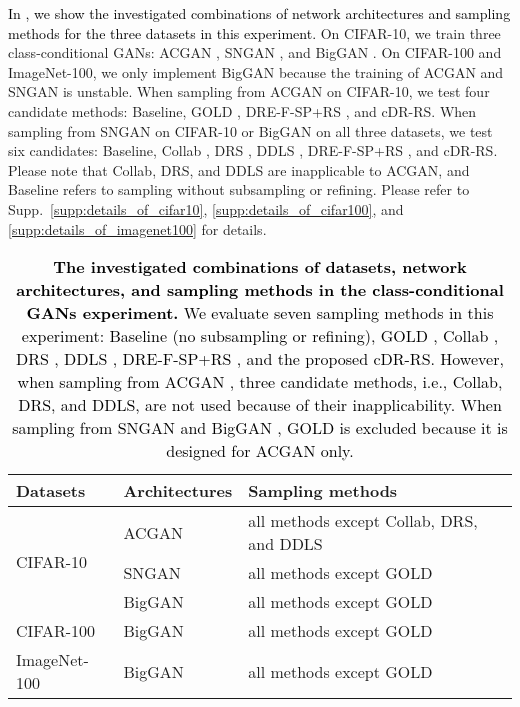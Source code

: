 \documentclass[final,12pt, 3p,times]{elsarticle}
\def\rev#1{\textcolor{black}{#1}}
\begin{document}
\rev{In , we show the investigated combinations of network architectures and sampling methods for the three datasets in this experiment.} 
On CIFAR-10, we train three class-conditional GANs: ACGAN \cite{odena2017conditional}, SNGAN \cite{miyato2018spectral}, and BigGAN \cite{brock2018large}. On CIFAR-100 and ImageNet-100, we only implement BigGAN because the training of ACGAN and SNGAN is unstable. When sampling from ACGAN on CIFAR-10, we test four candidate methods: Baseline, GOLD \cite{mo2019mining}, DRE-F-SP+RS \cite{ding2020subsampling}, and cDR-RS. When sampling from SNGAN on CIFAR-10 or BigGAN on all three datasets, we test six candidates: Baseline, Collab \cite{liu2020collaborative}, DRS \cite{azadi2018discriminator}, DDLS \cite{che2020your}, DRE-F-SP+RS \cite{ding2020subsampling}, and cDR-RS. Please note that Collab, DRS, and DDLS are inapplicable to ACGAN, and Baseline refers to sampling without subsampling or refining. Please refer to Supp.\ \ref{supp:details_of_cifar10}, \ref{supp:details_of_cifar100}, and \ref{supp:details_of_imagenet100} for details. 


\begin{table}[htbp]
  \centering
  \caption{\rev{\textbf{The investigated combinations of datasets, network architectures, and sampling methods in the class-conditional GANs experiment.} We evaluate seven sampling methods in this experiment: Baseline (no subsampling or refining), GOLD \cite{mo2019mining}, Collab \cite{liu2020collaborative}, DRS \cite{azadi2018discriminator}, DDLS \cite{che2020your}, DRE-F-SP+RS \cite{ding2020subsampling}, and the proposed cDR-RS. However, when sampling from ACGAN \cite{odena2017conditional}, three candidate methods, i.e., Collab, DRS, and DDLS, are not used because of their inapplicability. When sampling from SNGAN \cite{miyato2018spectral} and BigGAN \cite{brock2018large}, GOLD is excluded because it is designed for ACGAN only.}}
    \begin{adjustbox}{width=0.75\textwidth}
    \begin{tabular}{lll}
    \hline\hline
    \textbf{Datasets} & \textbf{Architectures} & \textbf{Sampling methods} \\
    \hline
    \multicolumn{1}{l}{\multirow{3}[0]{*}{CIFAR-10}} & ACGAN & all methods except Collab, DRS, and DDLS \\
    \multicolumn{1}{l}{} & SNGAN & all methods except GOLD \\
    \multicolumn{1}{l}{} & BigGAN & all methods except GOLD \\
    \hline
    CIFAR-100 & BigGAN & all methods except GOLD \\
    \hline
    ImageNet-100 & BigGAN & all methods except GOLD \\
    \bottomrule
    \end{tabular}\end{adjustbox}
  \label{tab:dataset_arch_samp_classification}\end{table}
\end{document}
